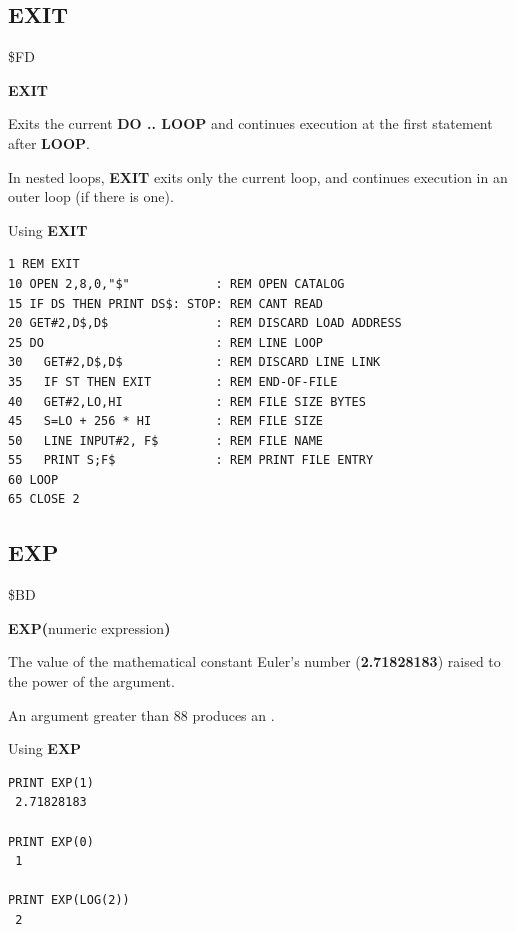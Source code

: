 \subsection{EXIT}
\begin{description}[leftmargin=2cm,style=nextline]
\item [Token:] \$FD
\item [Format:] {\bf EXIT}
\item [Usage:] Exits the current {\bf DO .. LOOP}
               and continues execution at the first
               statement after {\bf LOOP}.

\item [Remarks:] In nested loops, {\bf EXIT} exits only the current loop,
               and continues execution in an outer loop (if there is one).
\item [Example:] Using {\bf EXIT}
\begin{tcolorbox}[colback=black,coltext=white]
\verbatimfont{\codefont}
\begin{verbatim}
1 REM EXIT
10 OPEN 2,8,0,"$"            : REM OPEN CATALOG
15 IF DS THEN PRINT DS$: STOP: REM CANT READ
20 GET#2,D$,D$               : REM DISCARD LOAD ADDRESS
25 DO                        : REM LINE LOOP
30   GET#2,D$,D$             : REM DISCARD LINE LINK
35   IF ST THEN EXIT         : REM END-OF-FILE
40   GET#2,LO,HI             : REM FILE SIZE BYTES
45   S=LO + 256 * HI         : REM FILE SIZE
50   LINE INPUT#2, F$        : REM FILE NAME
55   PRINT S;F$              : REM PRINT FILE ENTRY
60 LOOP
65 CLOSE 2
\end{verbatim}
\end{tcolorbox}
\end{description}


\newpage
\subsection{EXP}
\begin{description}[leftmargin=2cm,style=nextline]
\item [Token:] \$BD
\item [Format:] {\bf EXP(}numeric expression{\bf)}
\item [Returns:] The value of the mathematical constant
               Euler's number ({\bf 2.71828183})
               raised to the power of the
               argument.

\item [Remarks:] An argument greater than 88 produces
                 an .
\item [Examples:] Using {\bf EXP}
\begin{tcolorbox}[colback=black,coltext=white]
\verbatimfont{\codefont}
\begin{verbatim}
PRINT EXP(1)
 2.71828183

PRINT EXP(0)
 1

PRINT EXP(LOG(2))
 2
\end{verbatim}
\end{tcolorbox}
\end{description}

